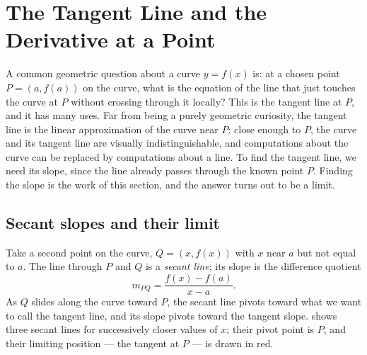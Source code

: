 \section{The Tangent Line and the Derivative at a Point}\label{sec:derivative-at-a-point}

A common geometric question about a curve \(y = f(x)\) is: at a chosen point \(P = (a, f(a))\) on the curve, what is the equation of the line that just touches the curve at \(P\) without crossing through it locally? This is the tangent line at \(P\), and it has many uses. Far from being a purely geometric curiosity, the tangent line is the linear approximation of the curve near \(P\): close enough to \(P\), the curve and its tangent line are visually indistinguishable, and computations about the curve can be replaced by computations about a line. To find the tangent line, we need its slope, since the line already passes through the known point \(P\). Finding the slope is the work of this section, and the answer turns out to be a limit.

\subsection{Secant slopes and their limit}

Take a second point on the curve, \(Q = (x, f(x))\) with \(x\) near \(a\) but not equal to \(a\). The line through \(P\) and \(Q\) is a \emph{secant line}; its slope is the difference quotient
\[
m_{PQ} = \frac{f(x) - f(a)}{x - a}.
\]
As \(Q\) slides along the curve toward \(P\), the secant line pivots toward what we want to call the tangent line, and its slope pivots toward the tangent slope.  shows three secant lines for successively closer values of \(x\); their pivot point is \(P\), and their limiting position --- the tangent at \(P\) --- is drawn in red.

